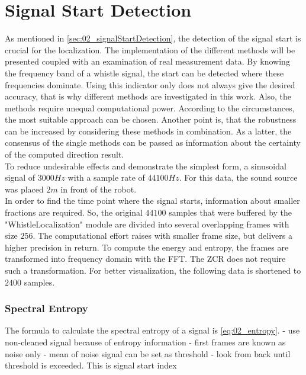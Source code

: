\section{Signal Start Detection}
\label{sec:03_signalStartDetection}

As mentioned in \ref{sec:02_signalStartDetection}, the detection of the
signal start is crucial for the localization.
The implementation of the different methods will be presented coupled with
an examination of real measurement data. By knowing the frequency band
of a whistle signal, the start can be detected where these frequencies dominate.
Using this indicator only does not always give the desired accuracy, that is why
different methods are investigated in this work. Also, the methods require
unequal computational power. According to the circumstances, the most suitable
approach can be chosen.
Another point is, that the robustness can be increased by considering these methods
in combination.
As a latter, the consensus of the single methods can be passed as information
about the certainty of the computed direction result.
\\
To reduce undesirable effects and demonstrate the simplest form, a sinusoidal
signal of $3000\si{Hz}$ with a sample rate of $44100\si{Hz}$. For this
data, the sound source was placed $2\si{m}$ in front of the robot.
\\
In order to find the time point where the signal starts, information about
smaller fractions are required.
So, the original $44100$ samples that were buffered by the
"WhistleLocalization" module are divided into several overlapping
frames with size $256$. The computational effort raises with smaller frame size,
but delivers a higher precision in return.
To compute the energy and entropy, the frames are transformed into
frequency domain with the \ac{FFT}.
The \ac{ZCR} does not require such a transformation.
For better visualization, the following data is shortened to $2400$ samples.


\subsubsection*{Spectral Entropy}

The formula to calculate the spectral entropy of a signal is \ref{eq:02_entropy}.
- use non-cleaned signal because of entropy information
- first frames are known as noise only
- mean of noise signal can be set as threshold
- look from back until threshold is exceeded. This is signal start index

